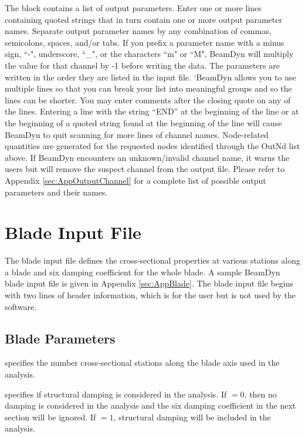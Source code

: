 The  block contains a list of output parameters. 
Enter one or more lines containing quoted strings that in turn contain one or more output parameter names.  
Separate output parameter names by any combination of commas, semicolons, spaces, and/or tabs.  
If you prefix a parameter name with a minus sign, ``-", underscore, ``\_", or the characters ``m" or ``M", BeamDyn will multiply the value for that channel by -1 before writing the data.  
The parameters are written in the order they are listed in the input file.  
`BeamDyn allows you to use multiple lines so that you can break your list into meaningful groups and so the lines can be shorter. 
You may enter comments after the closing quote on any of the lines.  
Entering a line with the string ``END'' at the beginning of the line or at the beginning of a quoted string found at the beginning of the line will cause BeamDyn to quit scanning for more lines of channel names.  
Node-related quantities are generated for the requested nodes identified through the OutNd list above.  
If BeamDyn encounters an unknown/invalid channel name, it warns the users but will remove the suspect channel from the output file. 
Please refer to Appendix \ref{sec:AppOutputChannel} for a complete list of possible output parameters and their names.

\section{Blade Input File}

The blade input file defines the cross-sectional properties at various stations along a blade and six damping coefficient for the whole blade. 
A sample BeamDyn blade input file is given in Appendix \ref{sec:AppBlade}. 
The blade input file begins with two lines of header information, which is for the user but is not used  by the software.

\subsection{Blade Parameters}

 specifies the number cross-sectional stations along the blade axis used in the analysis.

 specifies if structural damping is considered in the analysis. 
If  $= 0 $, then no damping is considered in the analysis and the six damping coefficient in the next section will be ignored. 
If  $ = 1$, structural damping will be included in the analysis.

